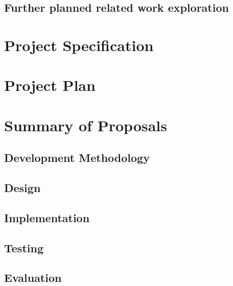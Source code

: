 \documentclass{ProgressReport}[2020/09/15]
\begin{document}
          \section{Further planned related work exploration}
        
        \chapter{Project Specification}
        \chapter{Project Plan}

        \chapter{Summary of Proposals}
        \section{Development Methodology}
        \section{Design}
        \section{Implementation}
        \section{Testing}
        \section{Evaluation}
	
	
	
	\clearpage
	\printbibliography
	\nocite{*} %
\end{document}
